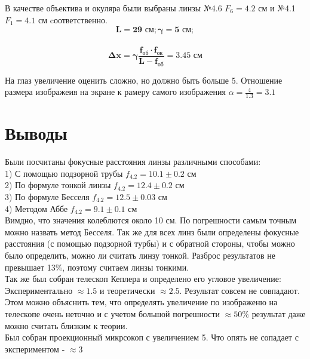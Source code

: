 В качестве объектива и окуляра были выбраны линзы №4.6 $F_6 = 4.2$ см и №4.1 $F_1 = 4.1$ см cоответственно.\\
$$\bm{L = 29\textbf{ см}; \gamma = 5 \textbf{ см}};$$ \\$$\bm{\Delta x = \gamma \frac{f_{\textbf{об}} \cdot f_{\textbf{ок}}}{L - f_{\textbf{об}}} = 3.45 \textbf{ см}}$$

На глаз увеличение оценить сложно, но должно быть больше 5.
Отношение размера изображеия на экране к рамеру самого изображения $\alpha = \frac{4}{1.3} = 3.1$

\section*{Выводы}
\indent Были посчитаны фокусные расстояния линзы различными способами:\\
1) С помощью подзорной трубы $f_{4.2} = 10.1 \pm 0.2$ см\\
2) По формуле тонкой линзы $f_{4.2} = 12.4 \pm 0.2$ см\\
3) По формуле Бесселя $f_{4.2} = 12.5 \pm 0.03$ см\\
4) Методом Аббе $f_{4.2} = 9.1 \pm 0.1$ см\\

Вимдно, что значения колеблются около 10 см. По погрешности самым точным можно назвать метод Бесселя.
Так же для всех линз были определены фокусные расстояния (с помощью подзорной турбы) и с обратной стороны, чтобы можно было определить, можно ли считать линзу тонкой.
Разброс результатов не превышает 13\%, поэтому считаем линзы тонкими.\\
\indent Так же был собран телескоп Кеплера и определено его угловое увеличение: Экспериментально $\approx 1.5$ и теоретически $\approx 2.5$. Результат совсем не совпадают. Этом можно объяснить тем, что определять увеличение по изображеню на телескопе очень неточно и с учетом большой погрешности $\approx 50\%$ результат даже можно считать близким к теории.\\
\indent Был собран проекционный микрсокоп с увеличением 5. Что опять не сопадает с экспериментом - $\approx 3$\\



